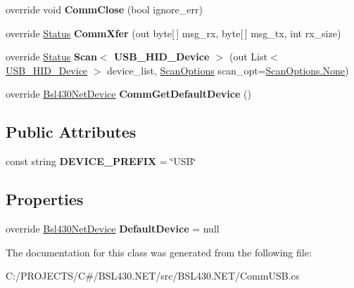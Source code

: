 \begin{DoxyCompactItemize}
override void {\bfseries Comm\+Close} (bool ignore\+\_\+err)
\item 
\mbox{\label{class_b_s_l430___n_e_t_1_1_comm_1_1_comm_u_s_b_ac22b5e0973d4455571f2498872647ab8}} 
override \mbox{\hyperlink{class_b_s_l430___n_e_t_1_1_status}{Status}} {\bfseries Comm\+Xfer} (out byte\mbox{[}$\,$\mbox{]} msg\+\_\+rx, byte\mbox{[}$\,$\mbox{]} msg\+\_\+tx, int rx\+\_\+size)
\item 
\mbox{\label{class_b_s_l430___n_e_t_1_1_comm_1_1_comm_u_s_b_afb88f366745983c779b121a297318459}} 
override \mbox{\hyperlink{class_b_s_l430___n_e_t_1_1_status}{Status}} {\bfseries Scan$<$ U\+S\+B\+\_\+\+H\+I\+D\+\_\+\+Device $>$} (out List$<$ \mbox{\hyperlink{class_b_s_l430___n_e_t_1_1_comm_1_1_u_s_b___h_i_d___device}{U\+S\+B\+\_\+\+H\+I\+D\+\_\+\+Device}} $>$ device\+\_\+list, \mbox{\hyperlink{namespace_b_s_l430___n_e_t_a4cd6f8166a2a97ccb3405df2287d4ba8}{Scan\+Options}} scan\+\_\+opt=\mbox{\hyperlink{namespace_b_s_l430___n_e_t_a4cd6f8166a2a97ccb3405df2287d4ba8a6adf97f83acf6453d4a6a4b1070f3754}{Scan\+Options.\+None}})
\item 
\mbox{\label{class_b_s_l430___n_e_t_1_1_comm_1_1_comm_u_s_b_a00d19a411eb6fc799a689dccc34b216d}} 
override \mbox{\hyperlink{class_b_s_l430___n_e_t_1_1_bsl430_net_device}{Bsl430\+Net\+Device}} {\bfseries Comm\+Get\+Default\+Device} ()
\end{DoxyCompactItemize}
\subsection*{Public Attributes}
\begin{DoxyCompactItemize}
\item 
\mbox{\label{class_b_s_l430___n_e_t_1_1_comm_1_1_comm_u_s_b_addbc937dbc947f4a42669d9969c1066f}} 
const string {\bfseries D\+E\+V\+I\+C\+E\+\_\+\+P\+R\+E\+F\+IX} = \char`\"{}U\+SB\char`\"{}
\end{DoxyCompactItemize}
\subsection*{Properties}
\begin{DoxyCompactItemize}
\item 
\mbox{\label{class_b_s_l430___n_e_t_1_1_comm_1_1_comm_u_s_b_a05c4c44edf2c917b820a77c6d8f2ee4e}} 
override \mbox{\hyperlink{class_b_s_l430___n_e_t_1_1_bsl430_net_device}{Bsl430\+Net\+Device}} {\bfseries Default\+Device} = null
\end{DoxyCompactItemize}


The documentation for this class was generated from the following file\+:\begin{DoxyCompactItemize}
\item 
C\+:/\+P\+R\+O\+J\+E\+C\+T\+S/\+C\#/\+B\+S\+L430.\+N\+E\+T/src/\+B\+S\+L430.\+N\+E\+T/Comm\+U\+S\+B.\+cs\end{DoxyCompactItemize}
